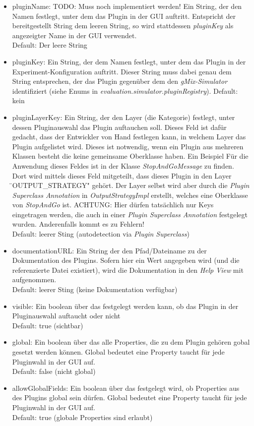\documentclass[a4paper, 11pt]{article} %
\begin{document}
\begin{itemize}
	\item pluginName: TODO: Muss noch implementiert werden!
	Ein String, der den Namen festlegt, unter dem das Plugin in der GUI auftritt. Entspricht der bereitgestellt String dem leeren String, so wird stattdessen \emph{pluginKey} als angezeigter Name in der GUI verwendet.\\
	Default: Der leere String
	\item pluginKey:
	Ein String, der dem Namen festlegt, unter dem das Plugin in der Experiment-Konfiguration auftritt. Dieser String muss dabei genau dem String entsprechen, der das Plugin gegenüber dem den \emph{gMix-Simulator} identifiziert (siehe Enums in \emph{evaluation.simulator.pluginRegistry}).
	Default: kein
	\item pluginLayerKey:
	Ein String, der den Layer (die Kategorie) festlegt, unter dessen Pluginauswahl das Plugin auftauchen soll. Dieses Feld ist dafür gedacht, dass der Entwickler von Hand festlegen kann, in welchem Layer das Plugin aufgelistet wird. Dieses ist notwendig, wenn ein Plugin aus mehreren Klassen besteht die keine gemeinsame Oberklasse haben. Ein Beispiel Für die Anwendung dieses Feldes ist in der Klasse \emph{StopAndGoMessage} zu finden. Dort wird mittels dieses Feld mitgeteilt, dass dieses Plugin in den Layer \"{}OUTPUT\_STRATEGY" gehört. Der Layer selbst wird aber durch die \emph{Plugin Superclass Annotation} in \emph{OutputStrategyImpl} erstellt, welches eine Oberklasse von \emph{StopAndGo} ist. ACHTUNG: Hier dürfen tatsächlich nur Keys eingetragen werden, die auch in einer \emph{Plugin Superclass Annotation} festgelegt wurden. Anderenfalls kommt es zu Fehlern!\\
	Default: leerer Sting (autodetection via \emph{Plugin Superclass})
	\item documentationURL:
	Ein String der den Pfad/Dateiname zu der Dokumentation des Plugins. Sofern hier ein Wert angegeben wird (und die referenzierte Datei existiert), wird die Dokumentation in den \emph{Help View} mit aufgenommen.\\
	Default: leerer Sting (keine Dokumentation verfügbar)
	\item visible:
	Ein boolean über das festgelegt werden kann, ob das Plugin in der Pluginauswahl auftaucht oder nicht\\
	Default: true (sichtbar)
	\item global:
	Ein boolean über das alle Properties, die zu dem Plugin gehören gobal gesetzt werden können. Global bedeutet eine Property taucht für jede Pluginwahl in der GUI auf.\\
	Default: false (nicht global)
	\item allowGlobalFields:
	Ein boolean über das festgelegt wird, ob Properties aus des Plugins global sein dürfen. Global bedeutet eine Property taucht für jede Pluginwahl in der GUI auf.\\
	Default: true (globale Properties sind erlaubt)
\end{itemize}
\end{document}
